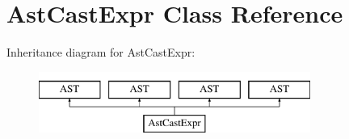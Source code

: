 \hypertarget{classAstCastExpr}{\section{Ast\-Cast\-Expr Class Reference}
\label{classAstCastExpr}
}
Inheritance diagram for Ast\-Cast\-Expr\-:\begin{figure}[H]
\begin{center}
\leavevmode
\includegraphics[height=2.000000cm]{classAstCastExpr}
\end{center}
\end{figure}

